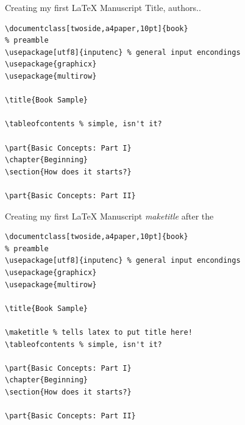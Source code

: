 \begin{frame}[fragile]{Creating my first \LaTeX{} Manuscript}
Title, authors..
\scriptsize
\begin{verbatim}
\documentclass[twoside,a4paper,10pt]{book}
% preamble
\usepackage[utf8]{inputenc} % general input encondings
\usepackage{graphicx}
\usepackage{multirow}

\title{Book Sample}

\tableofcontents % simple, isn't it?

\part{Basic Concepts: Part I}
\chapter{Beginning}
\section{How does it starts?}

\part{Basic Concepts: Part II}

\end{verbatim}
\end{frame}

\begin{frame}[fragile]{Creating my first \LaTeX{} Manuscript}
\emph{maketitle} after the \verb!!
\scriptsize
\begin{verbatim}
\documentclass[twoside,a4paper,10pt]{book}
% preamble
\usepackage[utf8]{inputenc} % general input encondings
\usepackage{graphicx}
\usepackage{multirow}

\title{Book Sample}

\maketitle % tells latex to put title here!
\tableofcontents % simple, isn't it?

\part{Basic Concepts: Part I}
\chapter{Beginning}
\section{How does it starts?}

\part{Basic Concepts: Part II}

\end{verbatim}
\end{frame}

